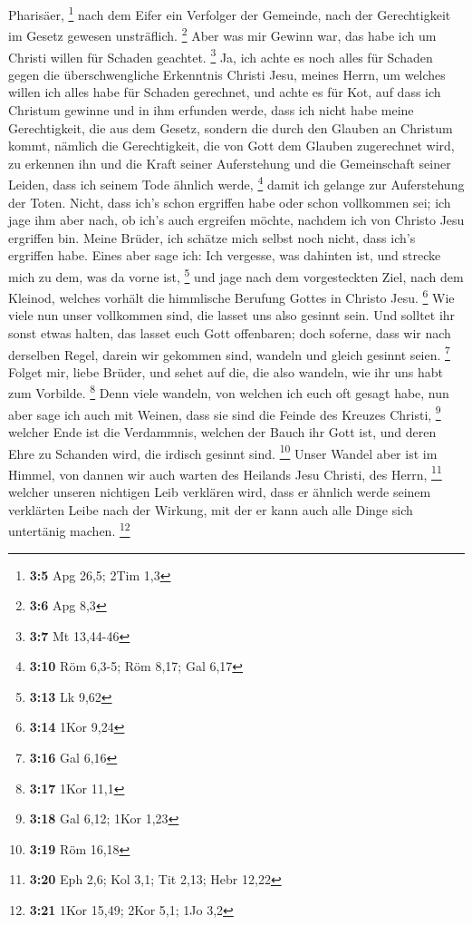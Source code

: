 Pharisäer, \footnote{\textbf{3:5} Apg 26,5; 2Tim 1,3}  nach
dem Eifer ein Verfolger der Gemeinde, nach der Gerechtigkeit im Gesetz
gewesen unsträflich. \footnote{\textbf{3:6} Apg 8,3}  Aber
was mir Gewinn war, das habe ich um Christi willen für Schaden geachtet.
\footnote{\textbf{3:7} Mt 13,44-46}  Ja, ich achte es noch
alles für Schaden gegen die überschwengliche Erkenntnis Christi Jesu,
meines Herrn, um welches willen ich alles habe für Schaden gerechnet,
und achte es für Kot, auf dass ich Christum gewinne  und in
ihm erfunden werde, dass ich nicht habe meine Gerechtigkeit, die aus dem
Gesetz, sondern die durch den Glauben an Christum kommt, nämlich die
Gerechtigkeit, die von Gott dem Glauben zugerechnet wird, 
zu erkennen ihn und die Kraft seiner Auferstehung und die Gemeinschaft
seiner Leiden, dass ich seinem Tode ähnlich werde, \footnote{\textbf{3:10}
  Röm 6,3-5; Röm 8,17; Gal 6,17}  damit ich gelange zur
Auferstehung der Toten.  Nicht, dass ich's schon ergriffen
habe oder schon vollkommen sei; ich jage ihm aber nach, ob ich's auch
ergreifen möchte, nachdem ich von Christo Jesu ergriffen bin.
 Meine Brüder, ich schätze mich selbst noch nicht, dass
ich's ergriffen habe. Eines aber sage ich: Ich vergesse, was dahinten
ist, und strecke mich zu dem, was da vorne ist, \footnote{\textbf{3:13}
  Lk 9,62}  und jage nach dem vorgesteckten Ziel, nach dem
Kleinod, welches vorhält die himmlische Berufung Gottes in Christo Jesu.
\footnote{\textbf{3:14} 1Kor 9,24}  Wie viele nun unser
vollkommen sind, die lasset uns also gesinnt sein. Und solltet ihr sonst
etwas halten, das lasset euch Gott offenbaren;  doch
soferne, dass wir nach derselben Regel, darein wir gekommen sind,
wandeln und gleich gesinnt seien. \footnote{\textbf{3:16} Gal 6,16}
 Folget mir, liebe Brüder, und sehet auf die, die also
wandeln, wie ihr uns habt zum Vorbilde. \footnote{\textbf{3:17} 1Kor
  11,1}  Denn viele wandeln, von welchen ich euch oft
gesagt habe, nun aber sage ich auch mit Weinen, dass sie sind die Feinde
des Kreuzes Christi, \footnote{\textbf{3:18} Gal 6,12; 1Kor 1,23}
 welcher Ende ist die Verdammnis, welchen der Bauch ihr
Gott ist, und deren Ehre zu Schanden wird, die irdisch gesinnt sind.
\footnote{\textbf{3:19} Röm 16,18}  Unser Wandel aber ist
im Himmel, von dannen wir auch warten des Heilands Jesu Christi, des
Herrn, \footnote{\textbf{3:20} Eph 2,6; Kol 3,1; Tit 2,13; Hebr 12,22}
 welcher unseren nichtigen Leib verklären wird, dass er
ähnlich werde seinem verklärten Leibe nach der Wirkung, mit der er kann
auch alle Dinge sich untertänig machen. \footnote{\textbf{3:21} 1Kor
  15,49; 2Kor 5,1; 1Jo 3,2}

